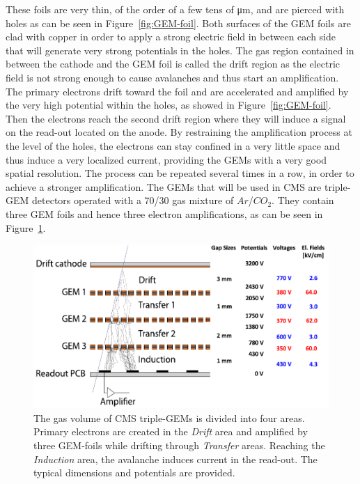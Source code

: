 	These foils are very thin, of the order of a few tens of \si{\micro m}, and are pierced with holes as can be seen in Figure~\ref{fig:GEM-foil}. Both surfaces of the GEM foils are clad with copper in order to apply a strong electric field in between each side that will generate very strong potentials in the holes. The gas region contained in between the cathode and the GEM foil is called the drift region as the electric field is not strong enough to cause avalanches and thus start an amplification. The primary electrons drift toward the foil and are accelerated and amplified by the very high potential within the holes, as showed in Figure~\ref{fig:GEM-foil}. Then the electrons reach the second drift region where they will induce a signal on the read-out located on the anode. By restraining the amplification process at the level of the holes, the electrons can stay confined in a very little space and thus induce a very localized current, providing the GEMs with a very good spatial resolution. The process can be repeated several times in a row, in order to achieve a stronger amplification. The GEMs that will be used in CMS are triple-GEM detectors operated with a 70/30 gas mixture of $Ar$/$CO_2$. They contain three GEM foils and hence three electron amplifications, as can be seen in Figure~\ref{fig:GEM-drift}.
	
\endgroup

\begingroup\setlength{\intextsep}{0pt}\setlength{\columnsep}{15pt}

	\begin{figure}
		\centering
		\includegraphics[width=\linewidth]{fig/chapt4/GEM-drift.pdf}
		\caption{\label{fig:GEM-drift} The gas volume of CMS triple-GEMs is divided into four areas. Primary electrons are created in the \textit{Drift} area and amplified by three GEM-foils while drifting through \textit{Transfer} areas. Reaching the \textit{Induction} area, the avalanche induces current in the read-out. The typical dimensions and potentials are provided.}
	\end{figure}
	
